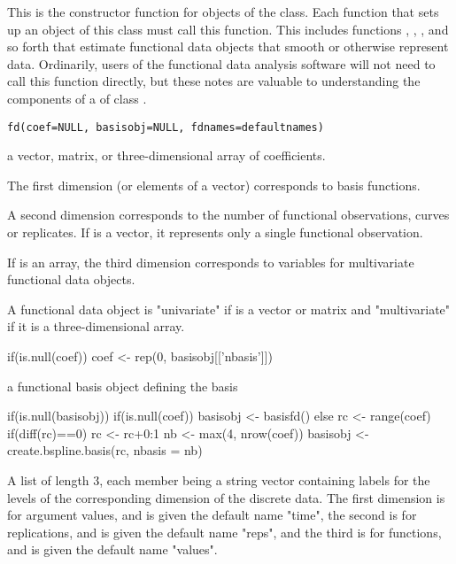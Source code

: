 \begin{Description}\relax
This is the constructor function for objects of the  class.
Each function that sets up an object of this class must call this
function.  This includes functions ,
, , and so forth that estimate
functional data objects that smooth or otherwise represent data.
Ordinarily, users of the functional data analysis software will not
need to call this function directly, but these notes are valuable to
understanding the components of a  of class .
\end{Description}
\begin{Usage}
\begin{verbatim}
fd(coef=NULL, basisobj=NULL, fdnames=defaultnames)
\end{verbatim}
\end{Usage}
\begin{Arguments}
\begin{ldescription}
\item[\code{coef}] a vector, matrix, or three-dimensional array of coefficients.

The first dimension (or elements of a vector) corresponds to basis
functions.

A second dimension corresponds to the number of functional
observations, curves or replicates.  If  is a vector, it
represents only a single functional observation.

If  is an array, the third dimension corresponds to
variables for multivariate functional data objects.

A functional data object is "univariate" if  is a vector
or matrix and "multivariate" if it is a three-dimensional array.

if(is.null(coef)) coef <- rep(0, basisobj[['nbasis']])

\item[\code{basisobj}] a functional basis object defining the basis

if(is.null(basisobj)){
if(is.null(coef)) basisobj <- basisfd()
else {
rc <- range(coef)
if(diff(rc)==0) rc <- rc+0:1
nb <- max(4, nrow(coef))
basisobj <- create.bspline.basis(rc, nbasis = nb)
}
}

\item[\code{fdnames}] A list of length 3, each member being a string vector containing
labels for the levels of the corresponding dimension of the discrete
data.  The first dimension is for argument values, and is given the
default name "time", the second is for replications, and is given
the default name "reps", and the third is for functions, and is
given the default name "values".

\end{ldescription}
\end{Arguments}

